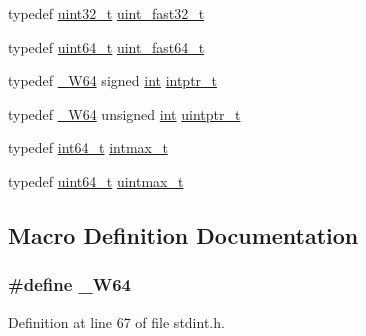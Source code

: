 \begin{DoxyCompactItemize}
typedef \hyperlink{lib-src_2ffmpeg_2win32_2stdint_8h_a6eb1e68cc391dd753bc8ce896dbb8315}{uint32\+\_\+t} \hyperlink{lib-src_2lv2_2msinttypes_2stdint_8h_a8f075c759c74e109e8184306c663809d}{uint\+\_\+fast32\+\_\+t}
\item 
typedef \hyperlink{lib-src_2ffmpeg_2win32_2stdint_8h_aec6fcb673ff035718c238c8c9d544c47}{uint64\+\_\+t} \hyperlink{lib-src_2lv2_2msinttypes_2stdint_8h_a6fd055dddb7d91fab0635146851af8d5}{uint\+\_\+fast64\+\_\+t}
\item 
typedef \hyperlink{lib-src_2lv2_2msinttypes_2stdint_8h_a3730e9bd68460c3bea497352ee69b9ae}{\+\_\+\+W64} signed \hyperlink{xmltok_8h_a5a0d4a5641ce434f1d23533f2b2e6653}{int} \hyperlink{lib-src_2lv2_2msinttypes_2stdint_8h_abd3131a20f4053d808d4277db3e39a23}{intptr\+\_\+t}
\item 
typedef \hyperlink{lib-src_2lv2_2msinttypes_2stdint_8h_a3730e9bd68460c3bea497352ee69b9ae}{\+\_\+\+W64} unsigned \hyperlink{xmltok_8h_a5a0d4a5641ce434f1d23533f2b2e6653}{int} \hyperlink{lib-src_2lv2_2msinttypes_2stdint_8h_a31b85deecb45924320becd11d3ee16ce}{uintptr\+\_\+t}
\item 
typedef \hyperlink{lib-src_2ffmpeg_2win32_2stdint_8h_a67a9885ef4908cb72ce26d75b694386c}{int64\+\_\+t} \hyperlink{lib-src_2lv2_2msinttypes_2stdint_8h_a036cd61bb4b30bb510b9538af4cebd1d}{intmax\+\_\+t}
\item 
typedef \hyperlink{lib-src_2ffmpeg_2win32_2stdint_8h_aec6fcb673ff035718c238c8c9d544c47}{uint64\+\_\+t} \hyperlink{lib-src_2lv2_2msinttypes_2stdint_8h_a2ba5f6c0633401558d277b2c0e4f758d}{uintmax\+\_\+t}
\end{DoxyCompactItemize}


\subsection{Macro Definition Documentation}
\subsubsection[{\texorpdfstring{\+\_\+\+W64}{_W64}}]{\setlength{\rightskip}{0pt plus 5cm}\#define \+\_\+\+W64}\hypertarget{lib-src_2lv2_2msinttypes_2stdint_8h_a3730e9bd68460c3bea497352ee69b9ae}{}\label{lib-src_2lv2_2msinttypes_2stdint_8h_a3730e9bd68460c3bea497352ee69b9ae}


Definition at line 67 of file stdint.\+h.

